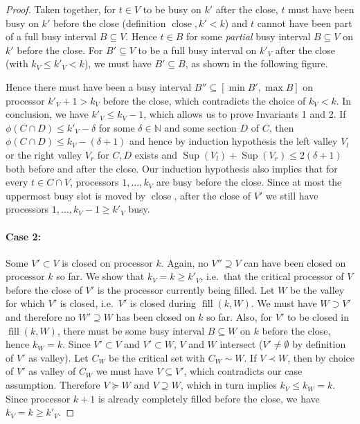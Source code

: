 \documentclass[a4paper]{article}
\DeclareMathOperator{\fillop}{fill}
\DeclareMathOperator{\close}{close}
\DeclareMathOperator{\res}{Sup}
\begin{document}
\begin{proof}
      Taken together, for $t \in V$ to be busy on $k'$ after the close, $t$ must have been busy on $k'$ before the close (definition $\close, k' < k$) and $t$ cannot have been part of a full busy interval $B \subseteq V$.
      Hence $t \in B$ for some \emph{partial} busy interval $B \subseteq V$ on $k'$ before the close.
      For $B' \subseteq V$ to be a full busy interval on $k'_V$ after the close (with $k_V \leq k'_V < k$), we must have $B' \subseteq B$, as shown in the following figure.
      \begin{figure}[H]
        \centering
        
      \end{figure}
      Hence there must have been a busy interval $B'' \subseteq [\min B', \max B]$ on processor $k'_V + 1 > k_V$ before the close, which contradicts the choice of $k_V < k$.
      In conclusion, we have $k'_V \leq k_V - 1$, which allows us to prove Invariants 1 and 2.
      If $\phi(C \cap D) \leq k'_{V} - \delta$ for some $\delta \in \mathbb{N}$ and some section $D$ of $C$, then $\phi(C \cap D) \leq k_V - (\delta + 1)$ and hence by induction hypothesis the left valley $V_l$ or the right valley $V_r$ for $C, D$ exists and $\res(V_l) + \res(V_r) \leq 2 (\delta + 1)$ both before and after the close.
      Our induction hypothesis also implies that for every $t \in C \cap V$, processors $1, \ldots, k_V$ are busy before the close.
      Since at most the uppermost busy slot is moved by $\close$, after the close of $V'$ we still have processors $1, \ldots, k_V - 1 \geq k'_V$ busy.

  \paragraph{Case 2:}\label{case:2}
      Some $V' \subset V$ is closed on processor $k$.
      Again, no $V'' \supseteq V$ can have been closed on processor $k$ so far.
      We show that $k_V = k \geq k'_V$, i.e.\ that the critical processor of $V$ before the close of $V'$ is the processor currently being filled.
      Let $W$ be the valley for which $V'$ is closed, i.e.\ $V'$ is closed during $\fillop(k, W)$.
      We must have $W \supset V'$ and therefore no $W' \supseteq W$ has been closed on $k$ so far.
      Also, for $V'$ to be closed in $\fillop(k, W)$, there must be some busy interval $B \subseteq W$ on $k$ before the close, hence $k_W = k$.
      Since $V' \subset V$ and $V' \subset W$, $V$ and $W$ intersect ($V' \neq \emptyset$ by definition of $V'$ as valley).
      Let $C_W$ be the critical set with $C_W \sim W$.
      If $V \prec W$, then by choice of $V'$ as valley of $C_W$ we must have $V \subseteq V'$, which contradicts our case assumption.
      Therefore $V \succeq W$ and $V \supseteq W$, which in turn implies $k_V \leq k_W = k$.
      Since processor $k+1$ is already completely filled before the close, we have $k_V = k \geq k'_V$.


\end{proof}
\end{document}
